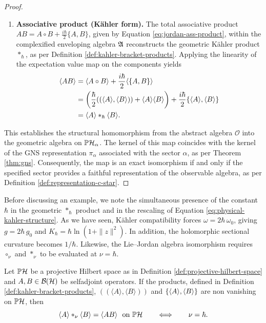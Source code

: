 \begin{proof}
\begin{enumerate}
		\item \textbf{Associative product (Kähler form).}
		The total associative product $AB = A \circ B + \frac{i\hbar}{2}\{A,B\}$, given by Equation \eqref{eq:jordan-ass-product}, within the complexified enveloping algebra $\mathfrak{A}$ reconstructs the geometric Kähler product $*_{\hbar}$, as per Definition \ref{def:kahler-bracket-products}. Applying the linearity of the expectation value map on the components yields
		\begin{align}
			\langle AB \rangle &= \langle A \circ B \rangle + \frac{i\hbar}{2}\langle \{A,B\} \rangle \nonumber \\
			&= \left( \frac{\hbar}{2}((\langle A \rangle, \langle B \rangle)) + \langle A \rangle \langle B \rangle \right) + \frac{i\hbar}{2}\{\langle A\rangle,\langle B\rangle\} \nonumber \\
			&= \langle A \rangle *_{\hbar} \langle B \rangle.
		\end{align} 
	\end{enumerate}
	This establishes the structural homomorphism from the abstract algebra $\mathcal{O}$ into the geometric algebra on $\PH_\alpha$. The kernel of this map coincides with the kernel of the GNS representation $\pi_\alpha$ associated with the sector $\alpha$, as per Theorem \ref{thm:gns}. Consequently, the map is an exact isomorphism if and only if the specified sector provides a faithful representation of the observable algebra, as per Definition \ref{def:representation-c-star}. 
\end{proof}

Before discussing an example, we note the simultaneous presence of the constant $\hbar$ in the geometric $*_{\hbar}$ product and in the rescaling of Equation \eqref{eq:physical-kahler-structure}. As we have seen, Kähler compatibility forces \(\omega = 2\hbar\,\omega_0\), giving \(g = 2\hbar\,g_0\) and \(K_{\hbar}=\hbar \ln(1+\|z\|^2)\). In addition, the holomorphic sectional curvature becomes \(1/\hbar\). Likewise, the Lie--Jordan algebra isomorphism requires \(\circ_{\nu}\) and \(*_{\nu}\) to be evaluated at \(\nu=\hbar\).

\begin{corollary}[Imposition of $\nu = \hbar$]
	\label{cor:hbar-structural-necessity}
	Let $\PH$ be a projective Hilbert space as in Definition \ref{def:projective-hilbert-space} and $A,B\in\BH$ be selfadjoint operators. If the products, defined in Definition \ref{def:kahler-bracket-products}, $((\langle A\rangle ,\langle B\rangle ))$ and
	$\{\langle A\rangle ,\langle B\rangle \}$ are non vanishing on $\PH$, then
	\begin{equation}
		\langle A\rangle *_{\nu} \langle B\rangle = \langle AB\rangle \ \text{ on } \PH
		\qquad\Longleftrightarrow\qquad \nu=\hbar.
	\end{equation}
\end{corollary}

